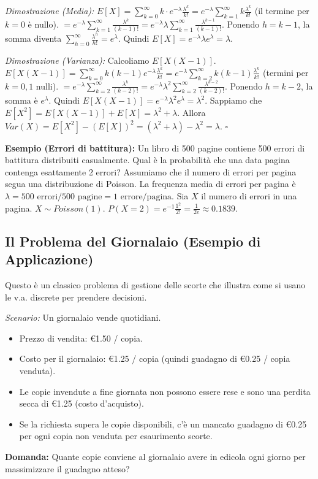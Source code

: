 \textit{Dimostrazione (Media):}
$E[X] = \sum_{k=0}^\infty k \cdot e^{-\lambda} \frac{\lambda^k}{k!} = e^{-\lambda} \sum_{k=1}^\infty k \frac{\lambda^k}{k!}$ (il termine per $k=0$ è nullo).
$= e^{-\lambda} \sum_{k=1}^\infty \frac{\lambda^k}{(k-1)!} = e^{-\lambda} \lambda \sum_{k=1}^\infty \frac{\lambda^{k-1}}{(k-1)!}$.
Ponendo $h=k-1$, la somma diventa $\sum_{h=0}^\infty \frac{\lambda^h}{h!} = e^\lambda$.
Quindi $E[X] = e^{-\lambda} \lambda e^\lambda = \lambda$.

\textit{Dimostrazione (Varianza):}
Calcoliamo $E[X(X-1)]$.
$E[X(X-1)] = \sum_{k=0}^\infty k(k-1) e^{-\lambda} \frac{\lambda^k}{k!} = e^{-\lambda} \sum_{k=2}^\infty k(k-1) \frac{\lambda^k}{k!}$ (termini per $k=0,1$ nulli).
$= e^{-\lambda} \sum_{k=2}^\infty \frac{\lambda^k}{(k-2)!} = e^{-\lambda} \lambda^2 \sum_{k=2}^\infty \frac{\lambda^{k-2}}{(k-2)!}$.
Ponendo $h=k-2$, la somma è $e^\lambda$.
Quindi $E[X(X-1)] = e^{-\lambda} \lambda^2 e^\lambda = \lambda^2$.
Sappiamo che $E[X^2] = E[X(X-1)] + E[X] = \lambda^2 + \lambda$.
Allora $Var(X) = E[X^2] - (E[X])^2 = (\lambda^2+\lambda) - \lambda^2 = \lambda$. $\square$

\begin{example}
\textbf{Esempio (Errori di battitura):}
Un libro di 500 pagine contiene 500 errori di battitura distribuiti casualmente. Qual è la probabilità che una data pagina contenga esattamente 2 errori?
Assumiamo che il numero di errori per pagina segua una distribuzione di Poisson.
La frequenza media di errori per pagina è $\lambda = 500 \text{ errori} / 500 \text{ pagine} = 1 \text{ errore/pagina}$.
Sia $X$ il numero di errori in una pagina. $X \sim Poisson(1)$.
$P(X=2) = e^{-1} \frac{1^2}{2!} = \frac{1}{2e} \approx 0.1839$.
\end{example}


\subsection{Il Problema del Giornalaio (Esempio di Applicazione)}
Questo è un classico problema di gestione delle scorte che illustra come si usano le v.a. discrete per prendere decisioni.

\textit{Scenario:}
Un giornalaio vende quotidiani.
\begin{itemize}
    \item Prezzo di vendita: €1.50 / copia.
    \item Costo per il giornalaio: €1.25 / copia (quindi guadagno di €0.25 / copia venduta).
    \item Le copie invendute a fine giornata non possono essere rese e sono una perdita secca di €1.25 (costo d'acquisto).
    \item Se la richiesta supera le copie disponibili, c'è un mancato guadagno di €0.25 per ogni copia non venduta per esaurimento scorte.
\end{itemize}
\textbf{Domanda:} Quante copie conviene al giornalaio avere in edicola ogni giorno per massimizzare il guadagno atteso?

